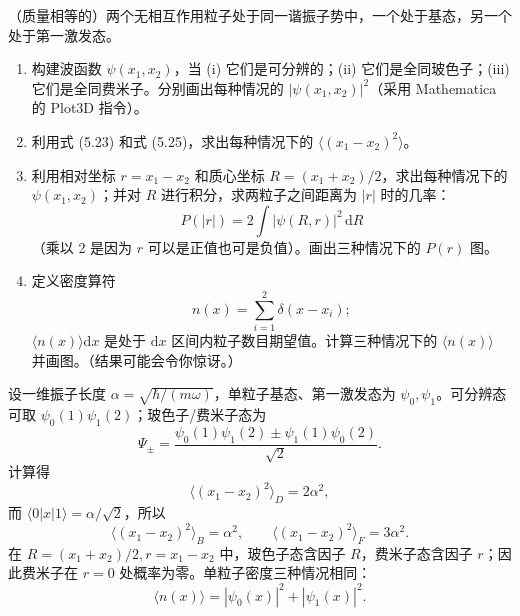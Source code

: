 \begin{question}
（质量相等的）两个无相互作用粒子处于同一谐振子势中，一个处于基态，另一个处于第一激发态。
\begin{enumerate}
\item 构建波函数 $\psi(x_1,x_2)$，当 (i) 它们是可分辨的；(ii) 它们是全同玻色子；(iii) 它们是全同费米子。分别画出每种情况的 $|\psi(x_1,x_2)|^2$（采用 Mathematica 的 Plot3D 指令）。
\item 利用式 (5.23) 和式 (5.25)，求出每种情况下的 $\langle (x_1-x_2)^2\rangle$。
\item 利用相对坐标 $r=x_1-x_2$ 和质心坐标 $R=(x_1+x_2)/2$，求出每种情况下的 $\psi(x_1,x_2)$；并对 $R$ 进行积分，求两粒子之间距离为 $|r|$ 时的几率：
\[
P(|r|)=2\int |\psi(R,r)|^2\,\mathrm dR
\]
（乘以 2 是因为 $r$ 可以是正值也可是负值）。画出三种情况下的 $P(r)$ 图。
\item 定义密度算符
\[
n(x)=\sum_{i=1}^{2}\delta(x-x_i);
\]
$\langle n(x)\rangle\mathrm dx$ 是处于 $\mathrm dx$ 区间内粒子数目期望值。计算三种情况下的 $\langle n(x)\rangle$ 并画图。（结果可能会令你惊讶。）
\end{enumerate}

\par\smallskip
{}

\end{question}
\begin{solution}

设一维振子长度 $\alpha=\sqrt{\hbar/(m\omega)}$，单粒子基态、第一激发态为 $\psi_0,\psi_1$。可分辨态可取 $\psi_0(1)\psi_1(2)$；玻色子/费米子态为
\[
\Psi_\pm=\frac{\psi_0(1)\psi_1(2)\pm\psi_1(1)\psi_0(2)}{\sqrt2}.
\]
计算得
\[
\langle(x_1-x_2)^2\rangle_D=2\alpha^2,
\]
而 $\langle0|x|1\rangle=\alpha/\sqrt2$，所以
\[
\langle(x_1-x_2)^2\rangle_B=\alpha^2,
\qquad
\langle(x_1-x_2)^2\rangle_F=3\alpha^2.
\]
在 $R=(x_1+x_2)/2,r=x_1-x_2$ 中，玻色子态含因子 $R$，费米子态含因子 $r$；因此费米子在 $r=0$ 处概率为零。单粒子密度三种情况相同：
\[
\langle n(x)\rangle=|\psi_0(x)|^2+|\psi_1(x)|^2.
\]

\end{solution}

